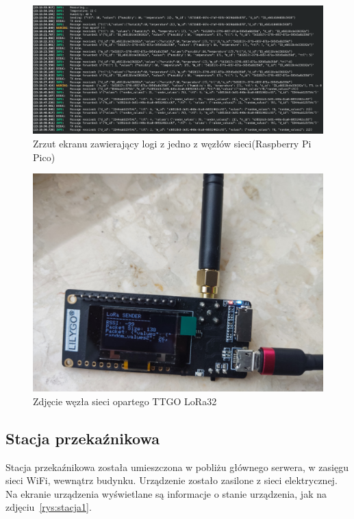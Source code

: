 \begin{figure}[b!]
    \begin{center}
        \includegraphics[width=13cm]{pic/logi-pico.png}
    \end{center}
    \caption{Zrzut ekranu zawierający logi z jedno z węzłów sieci(Raspberry Pi Pico)}\label{rys:logi-pico}
\end{figure}

\begin{figure}[b!]
    \begin{center}
        \includegraphics[width=13cm]{pic/wezel2.jpg}
    \end{center}
    \caption{Zdjęcie węzła sieci opartego  TTGO LoRa32}\label{rys:wezel2}
\end{figure}

\subsection{Stacja przekaźnikowa}
Stacja przekaźnikowa została umieszczona w pobliżu głównego serwera, w zasięgu sieci WiFi, wewnątrz budynku. Urządzenie zostało zasilone z sieci elektrycznej. Na ekranie urządzenia wyświetlane są informacje o stanie urządzenia, jak na zdjęciu~\ref{rys:stacja1}.

